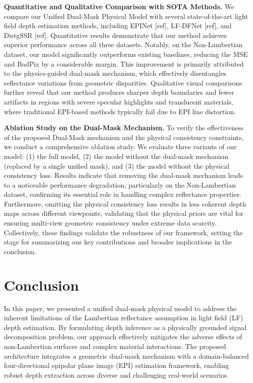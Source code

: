 \documentclass[lettersize,journal]{IEEEtran}
\begin{document}
\textbf{Quantitative and Qualitative Comparison with SOTA Methods.}
We compare our Unified Dual-Mask Physical Model with several state-of-the-art light field depth estimation methods, including EPINet [ref], LF-DFNet [ref], and DistgSSR [ref]. Quantitative results demonstrate that our method achieves superior performance across all three datasets. Notably, on the Non-Lambertian dataset, our model significantly outperforms existing baselines, reducing the MSE and BadPix by a considerable margin. This improvement is primarily attributed to the physics-guided dual-mask mechanism, which effectively disentangles reflectance variations from geometric disparities. Qualitative visual comparisons further reveal that our method produces sharper depth boundaries and fewer artifacts in regions with severe specular highlights and translucent materials, where traditional EPI-based methods typically fail due to EPI line distortion.

\textbf{Ablation Study on the Dual-Mask Mechanism.}
To verify the effectiveness of the proposed Dual-Mask mechanism and the physical consistency constraints, we conduct a comprehensive ablation study. We evaluate three variants of our model: (1) the full model, (2) the model without the dual-mask mechanism (replaced by a single unified mask), and (3) the model without the physical consistency loss. Results indicate that removing the dual-mask mechanism leads to a noticeable performance degradation, particularly on the Non-Lambertian dataset, confirming its essential role in handling complex reflectance properties. Furthermore, omitting the physical consistency loss results in less coherent depth maps across different viewpoints, validating that the physical priors are vital for ensuring multi-view geometric consistency under extreme data scarcity. Collectively, these findings validate the robustness of our framework, setting the stage for summarizing our key contributions and broader implications in the conclusion.

\section{Conclusion}

In this paper, we presented a unified dual-mask physical model to address the inherent limitations of the Lambertian reflectance assumption in light field (LF) depth estimation. By formulating depth inference as a physically grounded signal decomposition problem, our approach effectively mitigates the adverse effects of non-Lambertian surfaces and complex material interactions. The proposed architecture integrates a geometric dual-mask mechanism with a domain-balanced four-directional epipolar plane image (EPI) estimation framework, enabling robust depth extraction across diverse and challenging real-world scenarios.
\end{document}
